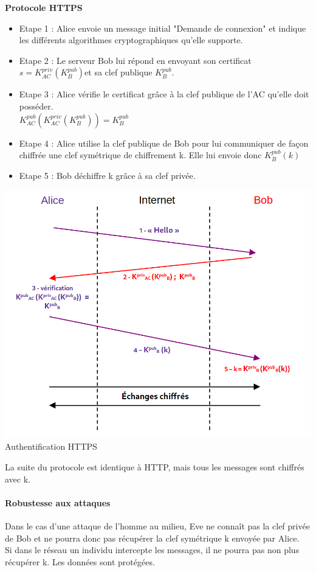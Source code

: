\begin{com}
	\textbf{Protocole HTTPS}
	\begin{itemize}
		\item Etape 1 : Alice envoie un message initial "Demande de connexion" et indique les différents algorithmes cryptographiques qu'elle supporte. 
		\item Etape 2 : Le serveur Bob lui répond en envoyant son certificat $s = K_{AC}^{priv}(K_{B}^{pub}) $et sa clef publique $ K_{B}^{pub}$.
		\item Etape 3 : Alice vérifie le certificat grâce à la clef publique de l'AC qu'elle doit posséder. 
		\\ $K_{AC}^{pub}(K_{AC}^{priv}(K_{B}^{pub})) = K_{B}^{pub}$
		\item Etape 4 : Alice utilise la clef publique de Bob pour lui communiquer de façon chiffrée une clef symétrique de chiffrement k. Elle lui envoie donc $K_{B}^{pub}(k)$
		\item Etape 5 : Bob déchiffre k grâce à sa clef privée.
	\end{itemize}
\end{com}

\begin{center}
	\includegraphics[scale=0.5]{Developpements/protocole https/https.png}
	{Authentification HTTPS}
\end{center}

La suite du protocole est identique à HTTP, mais tous les messages sont chiffrés avec k.

\paragraph{Robustesse aux attaques \\}
Dans le cas d'une attaque de l'homme au milieu, Eve ne connaît pas la clef privée de Bob et ne pourra donc pas récupérer la clef symétrique k envoyée par Alice. \\
Si dans le réseau un individu intercepte les messages, il ne pourra pas non plus récupérer k. Les données sont protégées. 
